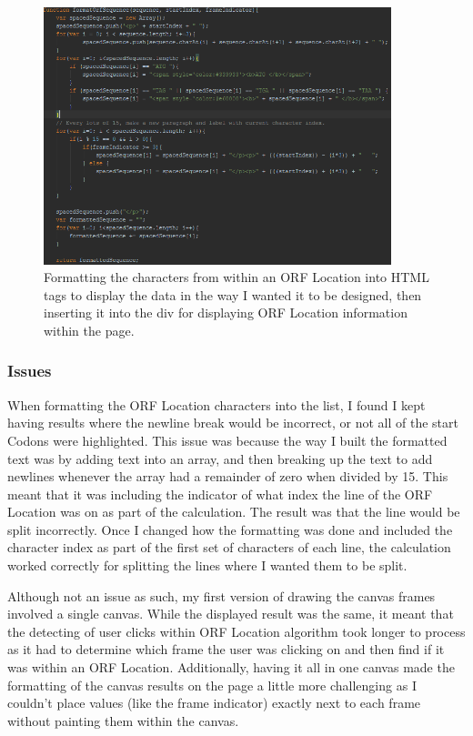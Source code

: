 \begin{figure}[H]
\centering
\includegraphics[width=0.9\textwidth]{images/orfdisplay3}
\caption{Formatting the characters from within an ORF Location into HTML tags to display the data in the way I wanted it to be designed, then inserting it into the div for displaying ORF Location information within the page.}
\end{figure}

\subsubsection{Issues}
When formatting the ORF Location characters into the list, I found I kept having results where the newline break would be incorrect, or not all of the start Codons were highlighted. This issue was because the way I built the formatted text was by adding text into an array, and then breaking up the text to add newlines whenever the array had a remainder of zero when divided by 15. This meant that it was including the indicator of what index the line of the ORF Location was on as part of the calculation. The result was that the line would be split incorrectly. Once I changed how the formatting was done and included the character index as part of the first set of characters of each line, the calculation worked correctly for splitting the lines where I wanted them to be split.

Although not an issue as such, my first version of drawing the canvas frames involved a single canvas. While the displayed result was the same, it meant that the detecting of user clicks within ORF Location algorithm took longer to process as it had to determine which frame the user was clicking on and then find if it was within an ORF Location. Additionally, having it all in one canvas made the formatting of the canvas results on the page a little more challenging as I couldn't place values (like the frame indicator) exactly next to each frame without painting them within the canvas.

